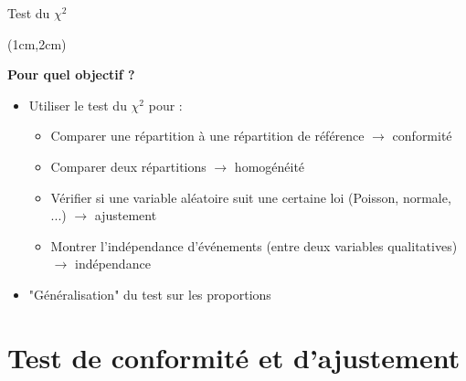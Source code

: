 \documentclass{beamer}
\begin{document}
\begin{frame}{Test du $\chi^2$}
\begin{textblock*}{\textwidth}(1cm,2cm)

\begin{center}{\bf \Large Pour quel objectif ?} \end{center}

\begin{itemize}
\item Utiliser le test du $\chi^2$ pour :
\begin{itemize}
\item Comparer une répartition à une répartition de référence $\rightarrow$ conformité
\item Comparer deux répartitions $\rightarrow$ homogénéité
\item Vérifier si une variable aléatoire suit une certaine loi (Poisson, normale, ...)   $\rightarrow$ ajustement
\item Montrer l'indépendance d'événements (entre deux variables qualitatives)  $\rightarrow$ indépendance
\end{itemize}

\item "Généralisation" du test sur les proportions
\end{itemize}

\end{textblock*}

\end{frame}


\section{Test de conformité et d'ajustement}
\end{document}
